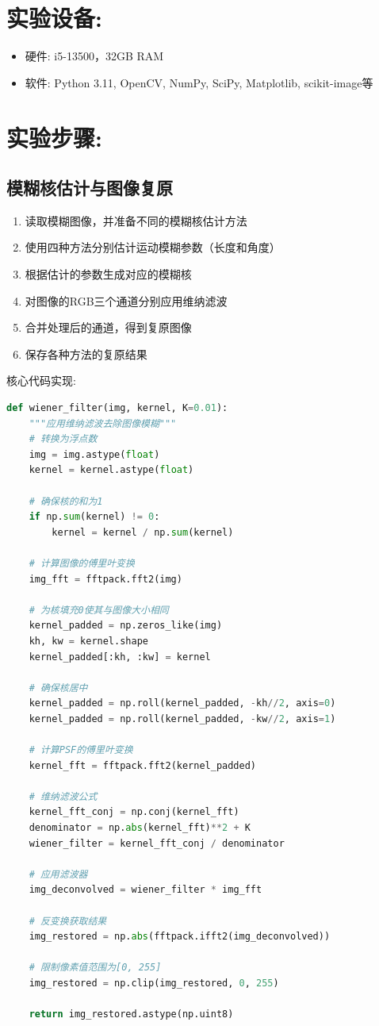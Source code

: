 \documentclass[a4paper,11pt,UTF8]{ctexart}
\begin{document}
\section{实验设备:}
\begin{itemize}
    \item 硬件: i5-13500，32GB RAM
    \item 软件: Python 3.11, OpenCV, NumPy, SciPy, Matplotlib, scikit-image等
\end{itemize}

\section{实验步骤:}
\subsection{模糊核估计与图像复原}
\begin{enumerate}
    \item 读取模糊图像，并准备不同的模糊核估计方法
    \item 使用四种方法分别估计运动模糊参数（长度和角度）
    \item 根据估计的参数生成对应的模糊核
    \item 对图像的RGB三个通道分别应用维纳滤波
    \item 合并处理后的通道，得到复原图像
    \item 保存各种方法的复原结果
\end{enumerate}

核心代码实现:
\begin{lstlisting}[language=Python]
def wiener_filter(img, kernel, K=0.01):
    """应用维纳滤波去除图像模糊"""
    # 转换为浮点数
    img = img.astype(float)
    kernel = kernel.astype(float)
    
    # 确保核的和为1
    if np.sum(kernel) != 0:
        kernel = kernel / np.sum(kernel)
    
    # 计算图像的傅里叶变换
    img_fft = fftpack.fft2(img)
    
    # 为核填充0使其与图像大小相同
    kernel_padded = np.zeros_like(img)
    kh, kw = kernel.shape
    kernel_padded[:kh, :kw] = kernel
    
    # 确保核居中
    kernel_padded = np.roll(kernel_padded, -kh//2, axis=0)
    kernel_padded = np.roll(kernel_padded, -kw//2, axis=1)
    
    # 计算PSF的傅里叶变换
    kernel_fft = fftpack.fft2(kernel_padded)
    
    # 维纳滤波公式
    kernel_fft_conj = np.conj(kernel_fft)
    denominator = np.abs(kernel_fft)**2 + K
    wiener_filter = kernel_fft_conj / denominator
    
    # 应用滤波器
    img_deconvolved = wiener_filter * img_fft
    
    # 反变换获取结果
    img_restored = np.abs(fftpack.ifft2(img_deconvolved))
    
    # 限制像素值范围为[0, 255]
    img_restored = np.clip(img_restored, 0, 255)
    
    return img_restored.astype(np.uint8)
\end{lstlisting}
\end{document}
